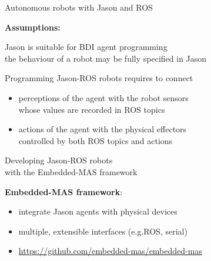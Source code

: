 \documentclass[compress]{beamer}
\begin{document}
\begin{frame}{Autonomous robots with Jason and ROS}

{\bf Assumptions:}\vspace{.5cm}

Jason is suitable for BDI agent programming\\
{\tiny the behaviour of a robot may be fully specified in Jason}\\ \vspace{.5cm}

Programming Jason-ROS robots requires to connect
\begin{itemize}
 \item  perceptions of the agent with the robot sensors \\
 {\tiny whose values are recorded in ROS topics}
 \item actions of the agent with the physical effectors\\
 {\tiny controlled by both ROS topics and actions}
\end{itemize}
\end{frame}




\begin{frame}{Developing Jason-ROS robots\\ {\scriptsize with the Embedded-MAS framework}}
 
 {\bf Embedded-MAS framework}: \vspace{.2cm}
 
 \vspace{.5cm}
 
%     
   \begin{itemize}
    \item integrate Jason agents with physical devices \vspace{.2cm}
    \item multiple, extensible interfaces (e.g.ROS, serial)\vspace{.2cm}
    \item \url{https://github.com/embedded-mas/embedded-mas}
   \end{itemize}
 
%  
\end{frame}
\end{document}

